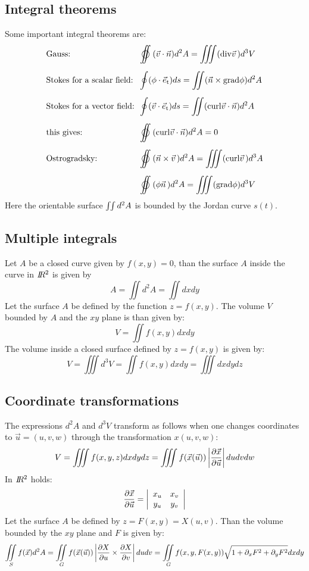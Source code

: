 \documentclass[twoside]{report}
\begin{document}
\subsection{Integral theorems}
Some important integral theorems are:
\[
\begin{array}{l@{~~}l}
\mbox{Gauss:}&\displaystyle\oiint(\vec{v}\cdot\vec{n})d^2A=\iiint({\rm div}\vvec{v})d^3V\\[5mm]
\mbox{Stokes for a scalar field:}&\displaystyle\oint(\phi\cdot\e{t})ds=\iint(\vec{n}\times{\rm grad}\phi)d^2A\\[5mm]
\mbox{Stokes for a vector field:}&\displaystyle\oint(\vec{v}\cdot\e{t})ds=\iint({\rm curl}\vec{v}\cdot\vec{n})d^2A\\[5mm]
\mbox{this gives:}&\displaystyle\oiint({\rm curl}\vec{v}\cdot\vec{n})d^2A=0\\[5mm]
\mbox{Ostrogradsky:}&\displaystyle\oiint(\vec{n}\times\vvec{v})d^2A=\iiint({\rm curl}\vvec{v})d^3A\\[5mm]
\mbox{}&\displaystyle\oiint(\phi\vvec{n})d^2A=\iiint({\rm grad}\phi)d^3V
\end{array}
\]
Here the orientable surface $\int\hspace{-1mm}\int d^2A$ is bounded by the
Jordan curve $s(t)$.

\subsection{Multiple integrals}
Let $A$ be a closed curve given by $f(x,y)=0$, than the surface $A$ inside
the curve in $I\hspace{-1mm}R^2$ is given by
\[
A=\iint d^2A=\iint dxdy
\]
Let the surface $A$ be defined by the function $z=f(x,y)$. The volume $V$
bounded by $A$ and the $xy$ plane is than given by:
\[
V=\iint f(x,y)dxdy
\]
The volume inside a closed surface defined by $z=f(x,y)$ is given by:
\[
V=\iiint d^3V=\iint f(x,y)dxdy=\iiint dxdydz
\]

\subsection{Coordinate transformations}
The expressions $d^2A$ and $d^3V$ transform as follows when one changes
coordinates to $\vec{u}=(u,v,w)$ through the transformation $x(u,v,w)$:
\[
V=\iiint f(x,y,z)dxdydz=\iiint f(\vec{x}(\vec{u}))\left|\Q{\vec{x}}{\vec{u}}\right|dudvdw
\]
In $I\hspace{-1mm}R^2$ holds:
\[
\frac{\partial \vec{x}}{\partial \vec{u}}=\left|\begin{array}{cc}x_u&x_v\\ y_u&y_v\end{array}\right|
\]
Let the surface $A$ be defined by $z=F(x,y)=X(u,v)$. Than the volume bounded by
the $xy$ plane and $F$ is given by:
\[
\int\hspace{-1.5ex}\int\limits_Sf(\vec{x})d^2A=\int\hspace{-1.5ex}\int\limits_Gf(\vec{x}(\vec{u}))
\left|\frac{\partial X}{\partial u}\times\frac{\partial X}{\partial v}\right|dudv=
\int\hspace{-1.5ex}\int\limits_Gf(x,y,F(x,y))\sqrt{1+\partial_xF^2+\partial_yF^2}dxdy
\]
\end{document}
